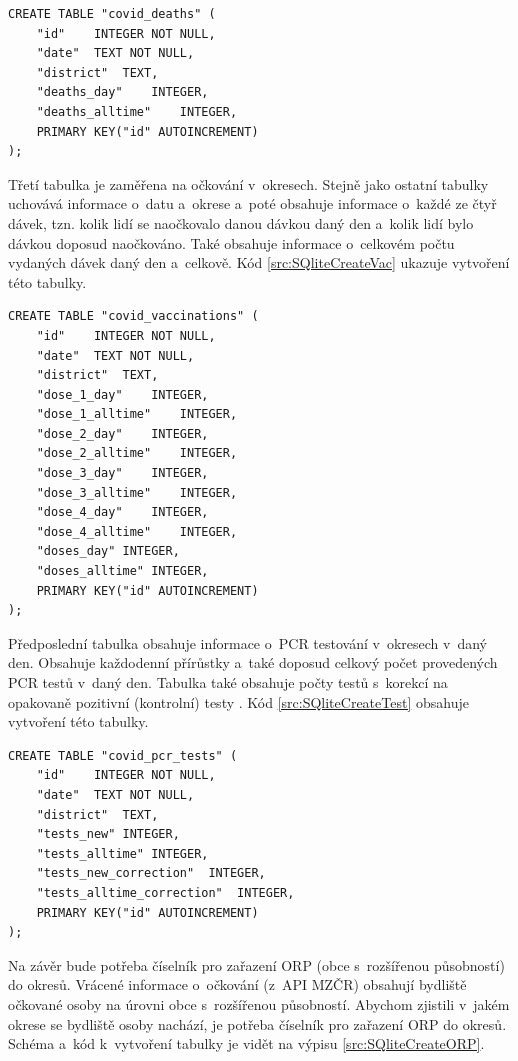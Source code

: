 \begin{lstlisting}[style=enhancedSQL,label=src:SQliteCreateDeaths,caption={Vytvoření SQlite tabulky na úmrtí}]
CREATE TABLE "covid_deaths" (
	"id"	INTEGER NOT NULL,
	"date"	TEXT NOT NULL,
	"district"	TEXT,
	"deaths_day"	INTEGER,
	"deaths_alltime"	INTEGER,
	PRIMARY KEY("id" AUTOINCREMENT)
);
\end{lstlisting}

Třetí tabulka je zaměřena na očkování v~okresech. Stejně jako ostatní tabulky uchovává informace o~datu a~okrese a~poté obsahuje informace o~každé ze čtyř dávek, tzn. kolik lidí se naočkovalo danou dávkou daný den a~kolik lidí bylo dávkou doposud naočkováno. Také obsahuje informace o~celkovém počtu vydaných dávek daný den a~celkově. Kód \ref{src:SQliteCreateVac} ukazuje vytvoření této tabulky.

\clearpage

\begin{lstlisting}[style=enhancedSQL,label=src:SQliteCreateVac,caption={Vytvoření SQLite tabulky na očkování}]
CREATE TABLE "covid_vaccinations" (
	"id"	INTEGER NOT NULL,
	"date"	TEXT NOT NULL,
	"district"	TEXT,
	"dose_1_day"	INTEGER,
	"dose_1_alltime"	INTEGER,
	"dose_2_day"	INTEGER,
	"dose_2_alltime"	INTEGER,
	"dose_3_day"	INTEGER,
	"dose_3_alltime"	INTEGER,
	"dose_4_day"	INTEGER,
	"dose_4_alltime"	INTEGER,
	"doses_day"	INTEGER,
	"doses_alltime"	INTEGER,
	PRIMARY KEY("id" AUTOINCREMENT)
);
\end{lstlisting}

Předposlední tabulka obsahuje informace o~PCR testování v~okresech v~daný den. Obsahuje každodenní přírůstky a~také doposud celkový počet provedených PCR testů v~daný den. Tabulka také obsahuje počty testů s~korekcí na opakovaně pozitivní (kontrolní) testy \cite{onemocneni-aktualne-docs}. Kód \ref{src:SQliteCreateTest} obsahuje vytvoření této tabulky.

\begin{lstlisting}[style=enhancedSQL,label=src:SQliteCreateTest,caption={Vytvoření SQLite tabulky na PCR testování}]
CREATE TABLE "covid_pcr_tests" (
	"id"	INTEGER NOT NULL,
	"date"	TEXT NOT NULL,
	"district"	TEXT,
	"tests_new"	INTEGER,
	"tests_alltime"	INTEGER,
	"tests_new_correction"	INTEGER,
	"tests_alltime_correction"	INTEGER,
	PRIMARY KEY("id" AUTOINCREMENT)
);
\end{lstlisting}

Na závěr bude potřeba číselník pro zařazení ORP (obce s~rozšířenou působností) do okresů. Vrácené informace o~očkování (z~API MZČR) obsahují bydliště očkované osoby na úrovni obce s~rozšířenou působností. Abychom zjistili v~jakém okrese se bydliště osoby nachází, je potřeba číselník pro zařazení ORP do okresů. Schéma a~kód k~vytvoření tabulky je vidět na výpisu \ref{src:SQliteCreateORP}.

